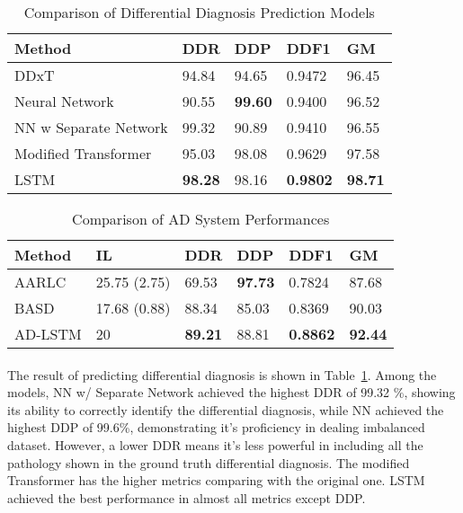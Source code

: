 \documentclass{article}
\begin{document}
\begin{table}[h]
\centering
\caption{Comparison of Differential Diagnosis Prediction Models}
\begin{tabular}{ p{2cm}p{2cm}p{2cm}p{2cm}p{2cm}}
 \hline
 \textbf{Method} & \textbf{DDR} & \textbf{DDP} & \textbf{DDF1} & \textbf{GM}\\
 \hline
 DDxT   & 94.84 & 94.65 &  0.9472 & 96.45\\
 \hline
 Neural Network & 90.55& \textbf{99.60} &  0.9400 & 96.52\\
 \hline
 NN w Separate Network  & 99.32  & 90.89 & 0.9410 & 96.55\\
 \hline
 Modified Transformer & 95.03 & 98.08 &  0.9629 & 97.58\\
 \hline
 LSTM    &\textbf{98.28} & 98.16&  \textbf{0.9802}& \textbf{98.71} \\
 \hline
\end{tabular}
\label{tab:Comparison Diff}
\end{table}

\begin{table}[h]
\centering
\caption{Comparison of AD System Performances}
\begin{tabular}{ p{2cm} p{2cm} p{2cm} p{2cm} p{2cm} p{2cm} }
 \hline
 \textbf{Method} & \textbf{IL} & \textbf{DDR} & \textbf{DDP} & \textbf{DDF1} & \textbf{GM} \\
 \hline
 AARLC  & 25.75 (2.75) & 69.53  & \textbf{97.73} & 0.7824 & 87.68 \\
 \hline
 BASD   & 17.68 (0.88) & 88.34 & 85.03 & 0.8369 & 90.03 \\
 \hline
 AD-LSTM  & 20 & \textbf{89.21} & 88.81 & \textbf{0.8862} & \textbf{92.44} \\
 \hline
\end{tabular}
\label{tab:Comparison AD}
\end{table}


\paragraph{ }
The result of predicting differential diagnosis is shown in Table~\ref{tab:Comparison Diff}. Among the models, NN w/ Separate Network achieved the highest DDR of 99.32 \%, showing its ability to correctly identify the differential diagnosis, while NN achieved the highest DDP of 99.6\%, demonstrating it's proficiency in dealing imbalanced dataset. However, a lower DDR means it's less powerful in including all the pathology shown in the ground truth differential diagnosis. The modified Transformer has the higher metrics comparing with the original one. LSTM achieved the best performance in almost all metrics except DDP. 
\end{document}
